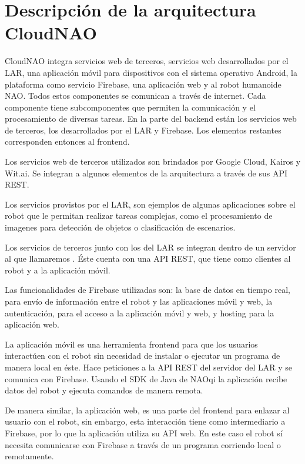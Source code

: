 \section{Descripción de la arquitectura CloudNAO}
\label{\detokenize{chapter_two/desc_cloudnao:descripcion-de-la-arquitectura-cloudnao}}\label{\detokenize{chapter_two/desc_cloudnao::doc}}
CloudNAO integra servicios web de
terceros, servicios web desarrollados por el LAR, una aplicación móvil para
dispositivos con el sistema operativo Android, la plataforma como servicio
Firebase, una aplicación web y al robot humanoide NAO. Todos estos componentes
se comunican a través de internet. Cada componente tiene subcomponentes que
permiten la comunicación y el procesamiento de diversas tareas. En la parte del
backend están los servicios web de terceros, los desarrollados
por el LAR y Firebase. Los elementos restantes corresponden entonces al
frontend.

Los servicios web de terceros utilizados son brindados por Google Cloud,
Kairos y Wit.ai. Se integran a algunos elementos de la arquitectura a través
de sus API REST.

Los servicios provistos por el LAR, son ejemplos de algunas aplicaciones sobre el
robot que le permitan realizar tareas complejas, como el procesamiento
de imagenes para detección de objetos o clasificación de escenarios.

Los servicios de terceros junto con los del LAR se integran dentro de un servidor al
que llamaremos . Éste cuenta
con una API REST, que tiene como clientes al robot y a la aplicación móvil.

Las funcionalidades de Firebase utilizadas son: la base de datos en tiempo real,
para envío de información entre el robot y las aplicaciones móvil y web,
la autenticación, para el acceso a la aplicación móvil y web, y hosting para
la aplicación web.

La aplicación móvil es una herramienta frontend para que los usuarios
interactúen con el robot sin necesidad de instalar o ejecutar un programa de
manera local en éste. Hace peticiones a la API REST del servidor del LAR y
se comunica con Firebase. Usando el SDK de Java de NAOqi la
aplicación recibe datos del robot y ejecuta comandos de manera remota.

De manera similar, la aplicación web, es una parte del frontend para enlazar
al usuario con el robot, sin embargo, esta interacción tiene como intermediario
a Firebase, por lo que la aplicación utiliza su API web. En este caso el robot
sí necesita comunicarse con Firebase a través de un programa corriendo local
o remotamente.

